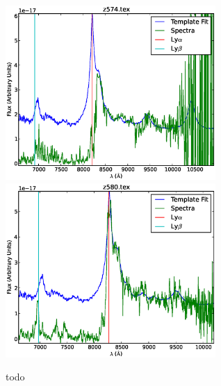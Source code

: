 \documentclass[11pt]{article}
\begin{document}
\begin{figure}[h]
  \includegraphics[width=8cm]{z574.eps}
  \includegraphics[width=8cm]{z580.eps}
  \caption{todo}
  \label{fig:todo}
\end{figure}
\end{document}
